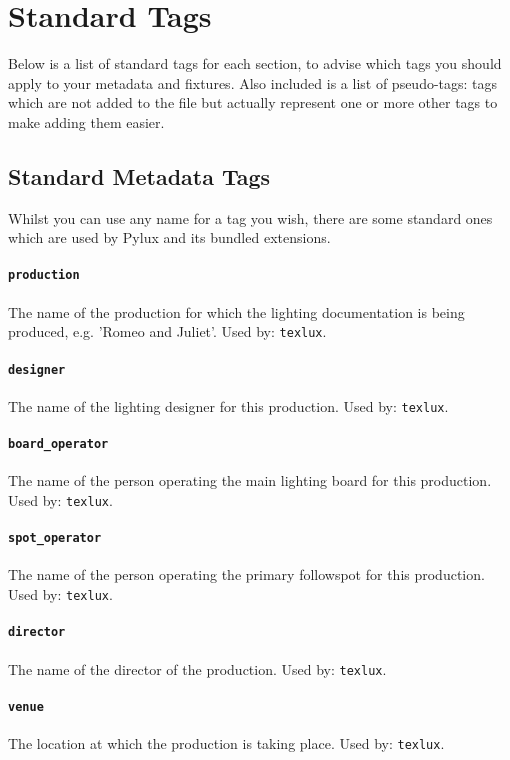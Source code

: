 \documentclass[a4paper]{article}
\begin{document}
\section{Standard Tags} \label{sec:plotfile}
Below is a list of standard tags for each section, to advise which tags you 
should apply to your metadata and fixtures. Also included is a list of 
pseudo-tags: tags which are not added to the file but actually represent one 
or more other tags to make adding them easier.

\subsection{Standard Metadata Tags}
Whilst you can use any name for a tag you wish, there are some standard ones 
which are used by Pylux and its bundled extensions.

\paragraph{\texttt{production}}
The name of the production for which the lighting documentation is being 
produced, e.g. 'Romeo and Juliet'. Used by: \texttt{texlux}.

\paragraph{\texttt{designer}}
The name of the lighting designer for this production. Used by: 
\texttt{texlux}.

\paragraph{\texttt{board\_operator}}
The name of the person operating the main lighting board for this production.
Used by: \texttt{texlux}.

\paragraph{\texttt{spot\_operator}}
The name of the person operating the primary followspot for this production.
Used by: \texttt{texlux}.

\paragraph{\texttt{director}}
The name of the director of the production. Used by: \texttt{texlux}.

\paragraph{\texttt{venue}}
The location at which the production is taking place. Used by: 
\texttt{texlux}.
\end{document}
